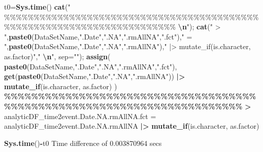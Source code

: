 \documentclass[
]{article}
\newenvironment{Shaded}{\begin{snugshade}}{\end{snugshade}}
\newcommand{\AttributeTok}[1]{\textcolor[rgb]{0.13,0.29,0.53}{#1}}
\newcommand{\ErrorTok}[1]{\textcolor[rgb]{0.64,0.00,0.00}{\textbf{#1}}}
\newcommand{\FloatTok}[1]{\textcolor[rgb]{0.00,0.00,0.81}{#1}}
\newcommand{\FunctionTok}[1]{\textcolor[rgb]{0.13,0.29,0.53}{\textbf{#1}}}
\newcommand{\NormalTok}[1]{#1}
\newcommand{\OtherTok}[1]{\textcolor[rgb]{0.56,0.35,0.01}{#1}}
\newcommand{\SpecialCharTok}[1]{\textcolor[rgb]{0.81,0.36,0.00}{\textbf{#1}}}
\newcommand{\StringTok}[1]{\textcolor[rgb]{0.31,0.60,0.02}{#1}}
\begin{document}
\begin{Shaded}
\begin{Highlighting}[]
  
\NormalTok{t0}\OtherTok{=}\FunctionTok{Sys.time}\NormalTok{()}
\FunctionTok{cat}\NormalTok{(}\StringTok{"    \%\%\%\%\%\%\%\%\%\%\%\%\%\%\%\%\%\%\%\%\%\%\%\%\%\%\%\%\%\%\%\%\%\%\%\%\%\%\%\%\%\%\%\%\%\%\%\%\%\%\%\%\%\%\%\%\%\%\%\%\%\%\%\%\%\%\%\%\%\%\%\%    }\SpecialCharTok{\textbackslash{}n}\StringTok{"}\NormalTok{); }\FunctionTok{cat}\NormalTok{(}\StringTok{" \textgreater{} "}\NormalTok{,}\FunctionTok{paste0}\NormalTok{(DataSetName,}\StringTok{".Date"}\NormalTok{,}\StringTok{".NA"}\NormalTok{,}\StringTok{".rmAllNA"}\NormalTok{,}\StringTok{".fct"}\NormalTok{),}\StringTok{" = "}\NormalTok{,}\FunctionTok{paste0}\NormalTok{(DataSetName,}\StringTok{".Date"}\NormalTok{,}\StringTok{".NA"}\NormalTok{,}\StringTok{".rmAllNA"}\NormalTok{),}\StringTok{" |\textgreater{} mutate\_if(is.character, as.factor)"}\NormalTok{,}\StringTok{"  }\SpecialCharTok{\textbackslash{}n}\StringTok{"}\NormalTok{, }\AttributeTok{sep=}\StringTok{""}\NormalTok{); }\FunctionTok{assign}\NormalTok{( }\FunctionTok{paste0}\NormalTok{(DataSetName,}\StringTok{".Date"}\NormalTok{,}\StringTok{".NA"}\NormalTok{,}\StringTok{".rmAllNA"}\NormalTok{,}\StringTok{".fct"}\NormalTok{), }\FunctionTok{get}\NormalTok{(}\FunctionTok{paste0}\NormalTok{(DataSetName,}\StringTok{".Date"}\NormalTok{,}\StringTok{".NA"}\NormalTok{,}\StringTok{".rmAllNA"}\NormalTok{)) }\SpecialCharTok{|\textgreater{}} \FunctionTok{mutate\_if}\NormalTok{(is.character, as.factor) )}
    \SpecialCharTok{\%\%\%\%\%\%\%\%\%\%\%\%\%\%\%\%\%\%\%\%\%\%\%\%\%\%\%\%\%\%\%\%\%\%\%\%\%\%\%\%\%\%\%\%\%\%\%\%\%\%\%\%\%\%\%\%\%\%\%\%\%\%\%\%\%\%\%\%\%\%\%\%}    
 \ErrorTok{\textgreater{}}\NormalTok{ analyticDF\_time2event.Date.NA.rmAllNA.fct }\OtherTok{=}\NormalTok{ analyticDF\_time2event.Date.NA.rmAllNA }\SpecialCharTok{|\textgreater{}} \FunctionTok{mutate\_if}\NormalTok{(is.character, as.factor)  }
\end{Highlighting}
\end{Shaded}

\begin{Shaded}
\begin{Highlighting}[]
\FunctionTok{Sys.time}\NormalTok{()}\SpecialCharTok{{-}}\NormalTok{t0}
\NormalTok{Time difference of }\FloatTok{0.003870964}\NormalTok{ secs}
\end{Highlighting}
\end{Shaded}
\end{document}
